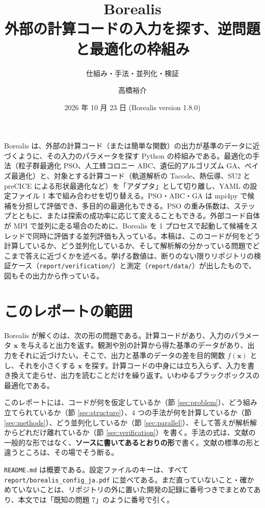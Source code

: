 \documentclass[11pt,a4paper,dvipdfmx]{jsarticle}
\title{Borealis\\[0.3\baselineskip]
\large 外部の計算コードの入力を探す、逆問題と最適化の枠組み}
\subtitle{仕組み・手法・並列化・検証}
\author{高橋裕介}
\date{2026 年 10 月 23 日 (Borealis version 1.8.0)}
\affiliation{北海道大学}
\begin{document}
\maketitle
\begin{borealisabstract}
Borealis は、外部の計算コード（または簡単な関数）の出力が基準のデータに近づくように、その入力のパラメータを探す Python の枠組みである。最適化の手法（粒子群最適化 PSO、人工蜂コロニー ABC、遺伝的アルゴリズム GA、ベイズ最適化）と、対象とする計算コード（軌道解析の Tacode、熱伝導、SU2 と preCICE による形状最適化など）を「アダプタ」として切り離し、YAML の設定ファイル 1 本で組み合わせを切り替える。PSO・ABC・GA は mpi4py で候補を分担して評価でき、多目的の最適化もできる。PSO の重み係数は、ステップとともに、または探索の成功率に応じて変えることもできる。外部コード自体が MPI で並列に走る場合のために、Borealis を 1 プロセスで起動して候補をスレッドで同時に評価する並列評価も入っている。本稿は、このコードが何をどう計算しているか、どう並列化しているか、そして解析解の分かっている問題でどこまで答えに近づくかを述べる。挙げる数値は、断りのない限りリポジトリの検証ケース（\texttt{report/verification/}）と測定（\texttt{report/data/}）が出したもので、図もその出力から作っている。
\end{borealisabstract}
\tableofcontents
\vspace{1em}

\section{このレポートの範囲}

Borealis が解くのは、次の形の問題である。計算コードがあり、入力のパラメータ $\mathbf{x}$ を与えると出力を返す。観測や別の計算から得た基準のデータがあり、出力をそれに近づけたい。そこで、出力と基準のデータの差を目的関数 $f(\mathbf{x})$ とし、それを小さくする $\mathbf{x}$ を探す。計算コードの中身には立ち入らず、入力を書き換えて走らせ、出力を読むことだけを繰り返す。いわゆるブラックボックスの最適化である。

このレポートには、コードが何を仮定しているか（節 \ref{sec:problem}）、どう組み立てられているか（節 \ref{sec:structure}）、4 つの手法が何を計算しているか（節 \ref{sec:methods}）、どう並列化しているか（節 \ref{sec:parallel}）、そして答えが解析解からどれだけ離れているか（節 \ref{sec:verification}）を書く。手法の式は、文献の一般的な形ではなく、\textbf{ソースに書いてあるとおりの形}で書く。文献の標準の形と違うところは、その場でそう断る。

\texttt{README.md} は概要である。設定ファイルのキーは、すべて \texttt{report/borealis\_config\_ja.pdf} に並べてある。まだ直っていないこと・確かめていないことは、リポジトリの外に置いた開発の記録に番号つきでまとめてあり、本文では「既知の問題 7」のように番号で引く。
\end{document}
